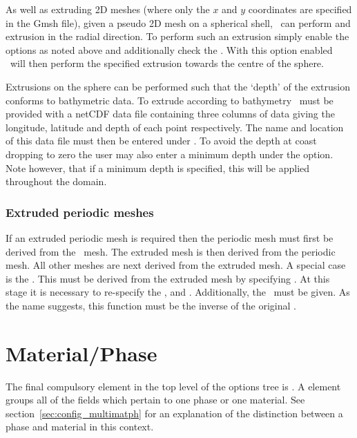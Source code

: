 As well as extruding 2D meshes (where only the $x$ and $y$ coordinates are
specified in the Gmsh file), given a pseudo 2D mesh on a spherical
shell, \fluidity\ can perform and extrusion in the radial direction. To
perform such an extrusion simply enable the options as noted above and
additionally check the . With this
option enabled \fluidity\ will then perform the specified extrusion towards
the centre of the sphere.

Extrusions on the sphere can be performed such that the `depth' of the extrusion
conforms to bathymetric data. To extrude according
to bathymetry \fluidity\ must be provided with a netCDF data file containing
three columns of data giving the longitude, latitude and depth
of each point respectively. The name and location of this data file must then be
entered under .
To avoid the depth at coast dropping to zero the user may also enter a minimum
depth under the  option. Note however, that
if a minimum depth is specified, this will be applied throughout the domain.

\subsubsection{Extruded periodic meshes}\label{sec:extrudedperiodic}

If an extruded periodic mesh is required then the periodic mesh must first
be derived from the \ mesh. The extruded mesh is then
derived from the periodic mesh. All other meshes are next derived from the
extruded mesh. A special case is the . This must be
derived from the extruded mesh by specifying
. At this stage it
is necessary to re-specify the ,
 and . Additionally, the
\ must be given. As the name suggests, this
function must be the inverse of the original .


\section{Material/Phase}
The final compulsory element in the top level of the options tree is
.  A  element groups all
of the fields which pertain to one phase or one material. See
section~\ref{sec:config_multimatph} for an explanation of the distinction
between a phase and material in this context.

